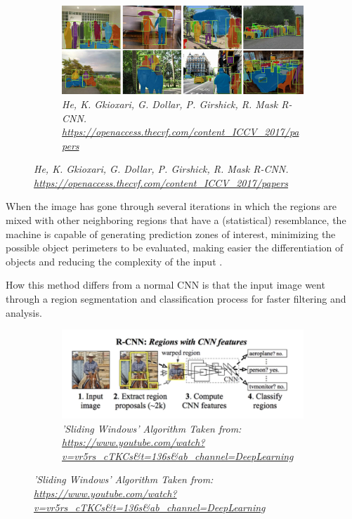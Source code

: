 \begin{figure}[H]
    \centering
    \begin{subfigure}[b]{0.8\textwidth}
        \centering
        \includegraphics[width=\textwidth]{Figures/2. Related Work/rcnn_1.png}
        \caption{\textit{He, K. Gkioxari, G. Dollar, P. Girshick, R. Mask R-CNN.
                \url{https://openaccess.thecvf.com/content_ICCV_2017/papers}
            }}
    \end{subfigure}
\end{figure}

When the image has gone through several iterations in which the regions are
mixed with other neighboring regions that have a (statistical) resemblance,
the machine is capable of generating prediction zones of interest, minimizing
the possible object perimeters to be evaluated, making easier the
differentiation of objects and reducing the complexity of the input \cite{rcnn_1}.

How this method differs from a normal CNN is that the input image went through
a region segmentation and classification process for faster filtering and
analysis.

\begin{figure}[H]
    \centering
    \begin{subfigure}[b]{0.6\textwidth}
        \centering
        \includegraphics[width=\textwidth]{Figures/2. Related Work/rcnn_2.png}
        \caption{\textit{'Sliding Windows' Algorithm Taken from:
                \url{https://www.youtube.com/watch?v=vr5rs_cTKCs&t=136s&ab_channel=DeepLearning}
            }}
    \end{subfigure}
\end{figure}


